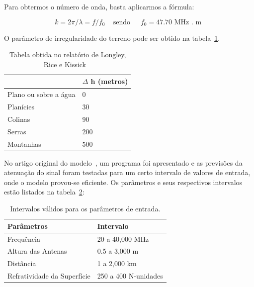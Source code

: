 Para obtermos o número de onda, basta aplicarmos a fórmula:

\[
k = 2\pi/\lambda = f/f_0 \,\,\,\,\, \text{ sendo} \,\,\,\,\,\,\,\,\, f_0 = 47.70 \text{ MHz . m }
\]

O parâmetro de irregularidade do terreno pode ser obtido na tabela~\ref{table:deltah}. \\

\begin{table}[h]
\centering
\caption[Valores para o parâmetro de irregularidade do terreno.]
{Tabela obtida no relatório de Longley, Rice  e Kissick ~\cite{longleyricedelta}} 
\label{table:deltah}
\begin{tabular}{ll}

\hline
                             & $\Delta$ h (metros) \\ \hline
Plano ou sobre a água        & 0                 \\
Planícies                    & 30                \\
Colinas                      & 90                \\
Serras                       & 200               \\
Montanhas                    & 500               
\end{tabular}
\end{table}

No artigo original do modelo~\cite{longleyrice}, um programa foi apresentado e as previsões da atenuação do sinal foram testadas para um certo intervalo de valores de entrada, onde o modelo provou-se eficiente. Os parâmetros e seus respectivos intervalos estão listados na tabela~\ref{table:longleyricevaluesinterval}:\\

\begin{table}[h]
\centering
\caption[Intervalos válidos para os parâmetros de entrada.]
{Intervalos válidos para os parâmetros de entrada.}
\label{table:longleyricevaluesinterval}
\begin{tabular}{ll}
\hline
Parâmetros                  & Intervalo            \\ \hline
Frequência                  & 20 a 40,000 MHz      \\
Altura das Antenas          & 0.5 a 3,000 m        \\
Distância                   & 1 a 2,000 km         \\
Refratividade da Superfície & 250 a 400 N-unidades
\end{tabular}
\end{table}

